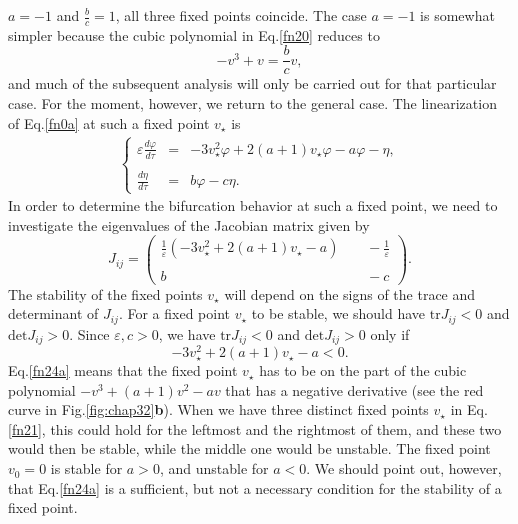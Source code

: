 $a=-1$ and $\frac{b}{c}=1$, all three fixed points coincide. The
case $a=-1$ is somewhat simpler because the cubic polynomial in
Eq.\eqref{fn20} reduces to \begin{equation}\label{fn22d} -v^3+v=\frac{b}{c}v, \end{equation} and
much of the subsequent analysis will only be carried out for that
particular case. For the moment, however, we return to the general
case. The linearization of Eq.\eqref{fn0a} at such a fixed point
$v_\star$ is
\begin{equation}\label{fn23}
\begin{split}
\left\{\begin{array}{lcl}
\varepsilon \frac{d\varphi}{d\tau}&=& -3v_\star^2\varphi +2(a+1)v_\star \varphi -a\varphi -\eta,\\\\
\frac{d\eta}{d\tau}&=& b\varphi -c \eta.
\end{array}\right.
\end{split}
\end{equation}
In order to determine the bifurcation behavior at such a fixed point, 
we need to investigate the eigenvalues of the Jacobian matrix given by
\begin{equation}\label{fn24}
J_{ij}=\left( \begin{array}{cc} \frac{1}{\varepsilon}(-3v_\star^2 +2(a+1)v_\star-a )&\:\:\:\:\: -\frac{1}{\varepsilon}\\\\
b&\:\:\:\:\: -c \end{array} \right).
\end{equation}
The stability of the fixed points $v_\star$ will depend on the signs of 
the trace and determinant of $J_{ij}$.
For a fixed point $v_\star$ to be stable, we should have $\mathrm{tr}J_{ij}<0$ and $\mathrm{det} 
J_{ij}>0$. Since $\varepsilon,c >0$, we have $\mathrm{tr}J_{ij}<0$ and $\mathrm{det} 
J_{ij}>0$ only if \begin{equation}\label{fn24a} -3v_\star^2 +2(a+1)v_\star  -a<0.
\end{equation} Eq.\eqref{fn24a} means that the fixed point $v_\star$ has to be
on the part of the cubic polynomial $-v^3+(a+1)v^2-av$ that
has a negative derivative (see the red curve in Fig.\ref{fig:chap32}\textbf{b}).
When we have three distinct fixed
points $v_\star$ in Eq.\eqref{fn21}, this could hold for the leftmost
and the rightmost of them,  and these two would then be  stable,
while the middle one would be unstable. The fixed point $v_0=0$ is
stable for $a>0$, and unstable for $a<0$.  We should point out,
however, that Eq.\eqref{fn24a} is a sufficient, but not a necessary
condition for the stability of a fixed point.

